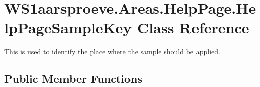 \hypertarget{class_w_s1aarsproeve_1_1_areas_1_1_help_page_1_1_help_page_sample_key}{}\section{W\+S1aarsproeve.\+Areas.\+Help\+Page.\+Help\+Page\+Sample\+Key Class Reference}
\label{class_w_s1aarsproeve_1_1_areas_1_1_help_page_1_1_help_page_sample_key}


This is used to identify the place where the sample should be applied.  


\subsection*{Public Member Functions}
